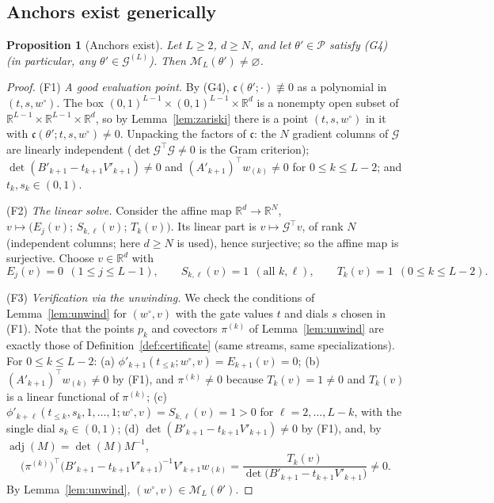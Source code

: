 \documentclass[11pt]{article}
\newtheorem{proposition}[theorem]{Proposition}
\theoremstyle{definition}
\theoremstyle{remark}
\theoremstyle{plain}
\newcommand{\R}{\mathbb{R}}
\newcommand{\cP}{\mathcal{P}}
\newcommand{\cM}{\mathcal{M}}
\newcommand{\cG}{\mathcal{G}}
\newcommand{\adj}{\operatorname{adj}}
\begin{document}
\subsection{Anchors exist generically}

\begin{proposition}[Anchors exist]\label{prop:anchorsexist}
Let $L\ge2$, $d\ge N$, and let $\theta'\in\cP$ satisfy \textup{(G4)} (in particular,
any $\theta'\in\cG^{(L)}$).  Then $\cM_L(\theta')\neq\varnothing$.
\end{proposition}

\begin{proof}
(F1) \emph{A good evaluation point.}  By (G4), $\mathfrak c(\theta';\cdot)\not\equiv0$
as a polynomial in $(t,s,w^\circ)$.  The box
$(0,1)^{L-1}\times(0,1)^{L-1}\times\R^d$ is a nonempty open subset of
$\R^{L-1}\times\R^{L-1}\times\R^d$, so by Lemma~\ref{lem:zariski} there is a point
$(t,s,w^\circ)$ in it with $\mathfrak c(\theta';t,s,w^\circ)\neq0$.  Unpacking the
factors of $\mathfrak c$: the $N$ gradient columns of $\mathcal G$ are linearly
independent ($\det\mathcal G^\top\mathcal G\neq0$ is the Gram criterion);
$\det(B'_{k+1}-t_{k+1}V'_{k+1})\neq0$ and $(A'_{k+1})^\top w_{(k)}\neq0$ for
$0\le k\le L-2$; and $t_k,s_k\in(0,1)$.

(F2) \emph{The linear solve.}  Consider the affine map
$\R^d\to\R^N$, $v\mapsto\big(E_j(v);\,S_{k,\ell}(v);\,T_k(v)\big)$.  Its linear part
is $v\mapsto\mathcal G^\top v$, of rank $N$ (independent columns; here $d\ge N$ is
used), hence surjective; so the affine map is surjective.  Choose $v\in\R^d$ with
\[
E_j(v)=0\ \ (1\le j\le L-1),\qquad
S_{k,\ell}(v)=1\ \ (\text{all }k,\ell),\qquad
T_k(v)=1\ \ (0\le k\le L-2).
\]

(F3) \emph{Verification via the unwinding.}  We check the conditions of
Lemma~\ref{lem:unwind} for $(w^\circ,v)$ with the gate values $t$ and dials $s$ chosen
in (F1).  Note that the points $p_k$ and covectors $\pi^{(k)}$ of
Lemma~\ref{lem:unwind} are exactly those of Definition~\ref{def:certificate} (same
streams, same specializations).  For $0\le k\le L-2$:
(a) $\phi'_{k+1}(t_{\le k};w^\circ,v)=E_{k+1}(v)=0$;
(b) $(A'_{k+1})^\top w_{(k)}\neq0$ by (F1), and $\pi^{(k)}\neq0$ because
$T_k(v)=1\neq0$ and $T_k(v)$ is a linear functional of $\pi^{(k)}$;
(c) $\phi'_{k+\ell}(t_{\le k},s_k,1,\dots,1;w^\circ,v)=S_{k,\ell}(v)=1>0$ for
$\ell=2,\dots,L-k$, with the single dial $s_k\in(0,1)$;
(d) $\det(B'_{k+1}-t_{k+1}V'_{k+1})\neq0$ by (F1), and, by
$\adj(M)=\det(M)M^{-1}$,
\[
\big(\pi^{(k)}\big)^\top\big(B'_{k+1}-t_{k+1}V'_{k+1}\big)^{-1}V'_{k+1}w_{(k)}
=\frac{T_k(v)}{\det\big(B'_{k+1}-t_{k+1}V'_{k+1}\big)}\neq0 .
\]
By Lemma~\ref{lem:unwind}, $(w^\circ,v)\in\cM_L(\theta')$.
\end{proof}
\end{document}
